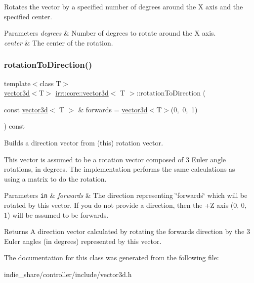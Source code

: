Rotates the vector by a specified number of degrees around the X axis and the specified center. 


\begin{DoxyParams}{Parameters}
{\em degrees} & Number of degrees to rotate around the X axis. \\
\hline
{\em center} & The center of the rotation. \\
\hline
\end{DoxyParams}
\mbox{\label{classirr_1_1core_1_1vector3d_a53d222e7aace72513210bddb2b25376f}} 
\subsubsection{\texorpdfstring{rotation\+To\+Direction()}{rotationToDirection()}}
{\footnotesize\ttfamily template$<$class T$>$ \\
\hyperlink{classirr_1_1core_1_1vector3d}{vector3d}$<$T$>$ \hyperlink{classirr_1_1core_1_1vector3d}{irr\+::core\+::vector3d}$<$ T $>$\+::rotation\+To\+Direction (\begin{DoxyParamCaption}\item[{const \hyperlink{classirr_1_1core_1_1vector3d}{vector3d}$<$ T $>$ \&}]{forwards = {\ttfamily \hyperlink{classirr_1_1core_1_1vector3d}{vector3d}$<$T$>$(0,~0,~1)} }\end{DoxyParamCaption}) const\hspace{0.3cm}{\ttfamily [inline]}}



Builds a direction vector from (this) rotation vector. 

This vector is assumed to be a rotation vector composed of 3 Euler angle rotations, in degrees. The implementation performs the same calculations as using a matrix to do the rotation.


\begin{DoxyParams}[1]{Parameters}
\mbox{\tt in}  & {\em forwards} & The direction representing \char`\"{}forwards\char`\"{} which will be rotated by this vector. If you do not provide a direction, then the +Z axis (0, 0, 1) will be assumed to be forwards. \\
\hline
\end{DoxyParams}
\begin{DoxyReturn}{Returns}
A direction vector calculated by rotating the forwards direction by the 3 Euler angles (in degrees) represented by this vector. 
\end{DoxyReturn}


The documentation for this class was generated from the following file\+:\begin{DoxyCompactItemize}
\item 
indie\+\_\+share/controller/include/vector3d.\+h\end{DoxyCompactItemize}
